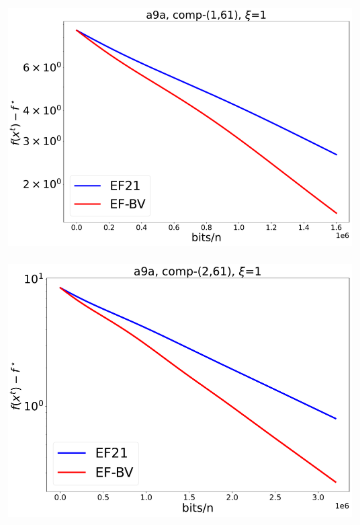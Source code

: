 \documentclass{article} %
\theoremstyle{plain}
\theoremstyle{definition}
\theoremstyle{remark}
\begin{document}
\begin{figure}[!htbp]
   \centering
   \begin{subfigure}[b]{0.32\textwidth}
      \centering
      \includegraphics[width=\textwidth]{img/a9a/CompK_61_1_a9a_8124workers_3000K_32561_a9a_61_1_1_1_logreg_diff_nonconv.pdf}
   \end{subfigure}
   \hfill
   \begin{subfigure}[b]{0.32\textwidth}
      \centering
      \includegraphics[width=\textwidth]{img/a9a/CompK_61_2_a9a_8124workers_3000K_32561_a9a_61_2_1_1_logreg_diff_nonconv.pdf}
   \end{subfigure}
   \hfill
   \begin{subfigure}[b]{0.32\textwidth}
      \centering

\end{subfigure}
\end{figure}
\end{document}
